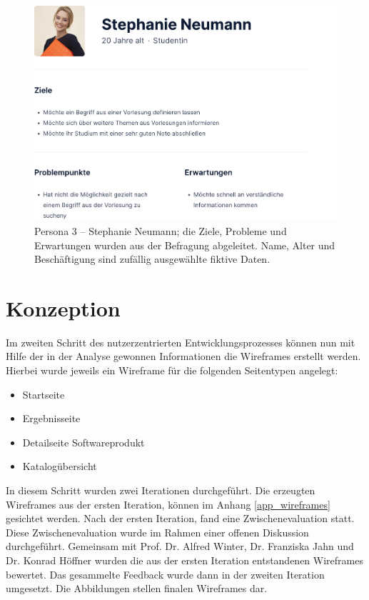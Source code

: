 \begin{figure}[H]
	\centering
    	\includegraphics[width=1.1\textwidth]{Images/Persona_3}
   	\caption[Persona 3]{Persona 3 -- Stephanie Neumann; die Ziele, Probleme und Erwartungen wurden aus der Befragung abgeleitet. Name, Alter und Beschäftigung sind zufällig ausgewählte fiktive Daten.}
   	\label{fig:persona3}
\end{figure}

\section{Konzeption}

Im zweiten Schritt des nutzerzentrierten Entwicklungsprozesses können nun mit Hilfe der in der Analyse gewonnen Informationen die Wireframes erstellt werden.
Hierbei wurde jeweils ein Wireframe für die folgenden Seitentypen angelegt:

\begin{itemize}
\item Startseite
\item Ergebnisseite
\item Detailseite Softwareprodukt
\item Katalogübersicht
\end{itemize}

In diesem Schritt wurden zwei Iterationen durchgeführt.
Die erzeugten Wireframes aus der ersten Iteration, können im Anhang \ref{app_wireframes} gesichtet werden.
Nach der ersten Iteration, fand eine Zwischenevaluation statt.
Diese Zwischenevaluation wurde im Rahmen einer offenen Diskussion durchgeführt.
Gemeinsam mit Prof. Dr. Alfred Winter, Dr. Franziska Jahn und Dr. Konrad Höffner wurden die aus der ersten Iteration entstandenen Wireframes bewertet.
Das gesammelte Feedback wurde dann in der zweiten Iteration umgesetzt.
Die Abbildungen  stellen finalen Wireframes dar.

